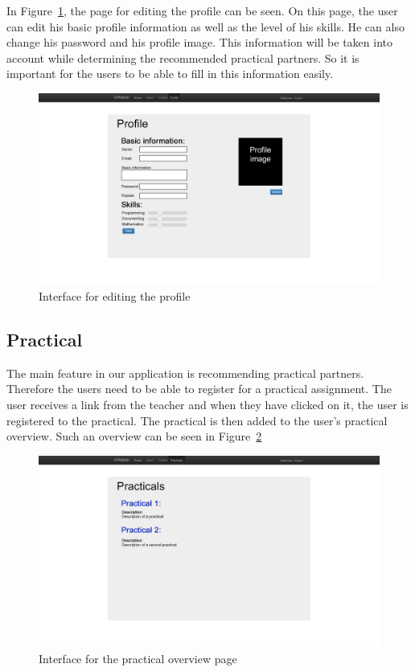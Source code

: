 In Figure~\ref{mockup_edit_profile}, the page for editing the profile can be seen.
On this page, the user can edit his basic profile information as well as the level of his skills.
He can also change his password and his profile image.
This information will be taken into account while determining the recommended practical partners.
So it is important for the users to be able to fill in this information easily.

\begin{figure}[H]
    \centering
    \captionsetup{justification=centering}
    \includegraphics[width=\textwidth, frame]{images/mockup_edit_profile}
    \caption{Interface for editing the profile}
    \label{mockup_edit_profile}
\end{figure}

\subsection{Practical}
The main feature in our application is recommending practical partners.
Therefore the users need to be able to register for a practical assignment.
The user receives a link from the teacher and when they have clicked on it, the user is registered to the practical.
The practical is then added to the user's practical overview.
Such an overview can be seen in Figure~\ref{mockup_practical_overview}

\begin{figure}[H]
    \centering
    \captionsetup{justification=centering}
    \includegraphics[width=\textwidth, frame]{images/mockup_practical_overview}
    \caption{Interface for the practical overview page}
    \label{mockup_practical_overview}
\end{figure}

